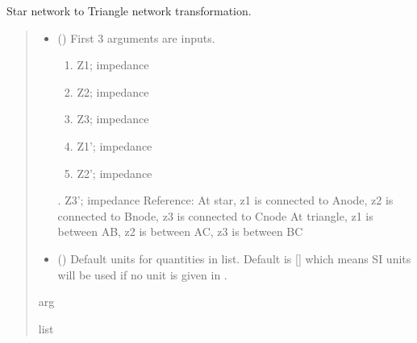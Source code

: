 \documentclass[letterpaper,10pt,english]{sphinxmanual}
\begin{document}

\begin{fulllineitems}
\label{\detokenize{components:components.Star2TriangleTransformation}}
\pysigstartsignatures
{}
\pysigstopsignatures
\sphinxAtStartPar
Star network to Triangle network transformation.
\begin{quote}\begin{description}
\begin{itemize}
\item {} 
\sphinxAtStartPar
{} () \textendash{} 
\sphinxAtStartPar
First 3 arguments are inputs.
\begin{enumerate}
%
\item {} 
\sphinxAtStartPar
Z1; impedance

\item {} 
\sphinxAtStartPar
Z2; impedance

\item {} 
\sphinxAtStartPar
Z3; impedance

\item {} 
\sphinxAtStartPar
Z1’; impedance

\item {} 
\sphinxAtStartPar
Z2’; impedance

\end{enumerate}

. Z3’; impedance
Reference:
At star, z1 is connected to A\sphinxhyphen{}node, z2 is connected to B\sphinxhyphen{}node, z3 is connected to C\sphinxhyphen{}node
At triangle, z1 is between A\sphinxhyphen{}B, z2 is between A\sphinxhyphen{}C, z3 is between B\sphinxhyphen{}C


\item {} 
\sphinxAtStartPar
{} (\sphinxstyleliteralemphasis{\sphinxupquote{, }}) \textendash{} Default units for quantities in  list. Default is {[}{]} which means SI units will be used if no unit is given in .

\end{itemize}

\sphinxAtStartPar
arg

\sphinxAtStartPar
list

\end{description}\end{quote}

\end{fulllineitems}
\end{document}
